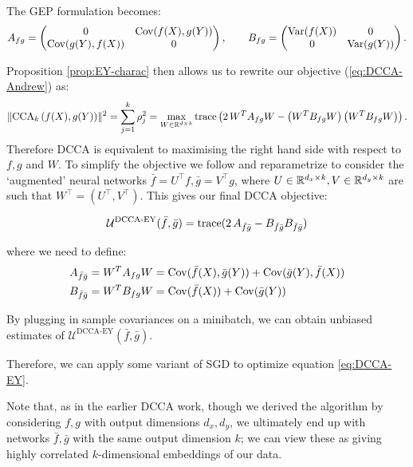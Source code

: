 The GEP formulation becomes:
\begin{equation*}
    A_{fg} = \begin{pmatrix} 0 &\mathrm{Cov}(f(X),g(Y)) \\ \mathrm{Cov}(g(Y),f(X)) & 0 \end{pmatrix}, \qquad
	B_{fg} = \begin{pmatrix}\mathrm{Var}(f(X)) & 0 \\ 0 & \mathrm{Var}(g(Y)) \end{pmatrix}.
\end{equation*}

Proposition \ref{prop:EY-charac} then allows us to rewrite our objective (\ref{eq:DCCA-Andrew}) as:
\begin{align*}
    \lVert\operatorname{CCA}_k\left(f(X),g(Y)\right)\rVert^2 
    = \sum_{j=1}^k \rho_j^2 
    = \max_{W \in \mathbb{R}^{d \times k}} \operatorname{trace} \left( 2\, W^T A_{fg} W - \left(W^T B_{fg} W\right) \left(W^T B_{fg} W\right) \right).
\end{align*}
Therefore DCCA is equivalent to maximising the right hand side with respect to $f,g$ and $W$. To simplify the objective we follow \cite{wang2015stochastic} and reparametrize to consider the `augmented' neural networks $\bar{f} = U^{\top} f, \bar{g} = V^{\top} g$, where $U\in \mathbb{R}^{d_x \times k}, V\in \mathbb{R}^{d_y \times k}$ are such that $W^{\top} = (U^{\top}, V^{\top})$. This gives our final DCCA objective:

\begin{align}\label{eq:DCCA-EY}
    \mathcal{U}^\text{DCCA-EY}(\bar{f},\bar{g}) = \operatorname{trace}(2 \, A_{\bar{f}\bar{g}} - B_{\bar{f}\bar{g}} B_{\bar{f}\bar{g}})
\end{align}

where we need to define:
\begin{align*}
    A_{\bar{f}\bar{g}}
    &= W^T A_{fg} W 
    = \mathrm{Cov}(\bar{f}(X),\bar{g}(Y)) + \mathrm{Cov}(\bar{g}(Y),\bar{f}(X)) \\
    B_{\bar{f}\bar{g}} 
    &= W^T B_{fg} W 
    = \mathrm{Cov}(\bar{f}(X)) + \mathrm{Cov}(\bar{g}(Y))
\end{align*}


By plugging in sample covariances on a minibatch, we can obtain unbiased estimates of $\mathcal{U}^\text{DCCA-EY}(\bar{f},\bar{g})$.

Therefore, we can apply some variant of SGD to optimize equation \ref{eq:DCCA-EY}.

Note that, as in the earlier DCCA work, though we derived the algorithm by considering $f,g$ with output dimensions $d_x,d_y$, we ultimately end up with networks $\bar{f},\bar{g}$ with the same output dimension $k$; we can view these as giving highly correlated $k$-dimensional embeddings of our data.

